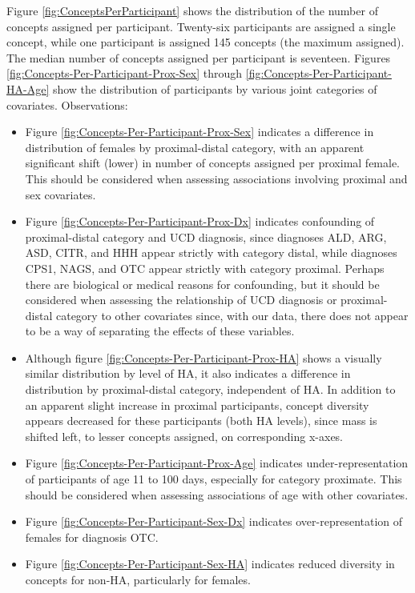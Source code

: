 \documentclass[10pt, letterpaper]{article}
\begin{document}
\begin{spacing}{1.0}
Figure \ref{fig:ConceptsPerParticipant} shows the distribution of the number of concepts assigned per participant.  Twenty-six participants are assigned a single concept, while one participant is assigned 145 concepts (the maximum assigned).  The median number of concepts assigned per participant is seventeen.  Figures \ref{fig:Concepts-Per-Participant-Prox-Sex} through \ref{fig:Concepts-Per-Participant-HA-Age} show the distribution of participants by various joint categories of covariates.  Observations:

\begin{itemize}
    \item Figure \ref{fig:Concepts-Per-Participant-Prox-Sex} indicates a difference in distribution of females by proximal-distal category, with an apparent significant shift (lower) in number of concepts assigned per proximal female.  This should be considered when assessing associations involving proximal and sex covariates.
    \item Figure \ref{fig:Concepts-Per-Participant-Prox-Dx} indicates confounding of proximal-distal category and UCD diagnosis, since diagnoses ALD, ARG, ASD, CITR, and HHH appear strictly with category distal, while diagnoses CPS1, NAGS, and OTC appear strictly with category proximal.  Perhaps there are biological or medical reasons for confounding, but it should be considered when assessing the relationship of UCD diagnosis or proximal-distal category to other covariates since, with our data, there does not appear to be a way of separating the effects of these variables.
    \item Although figure \ref{fig:Concepts-Per-Participant-Prox-HA} shows a visually similar distribution by level of HA, it also indicates a difference in distribution by proximal-distal category, independent of HA.  In addition to an apparent slight increase in proximal participants, concept diversity appears decreased for these participants (both HA levels), since mass is shifted left, to lesser concepts assigned, on corresponding x-axes.
    \item Figure \ref{fig:Concepts-Per-Participant-Prox-Age} indicates under-representation of participants of age 11 to 100 days, especially for category proximate.  This should be considered when assessing associations of age with other covariates.
    \item Figure \ref{fig:Concepts-Per-Participant-Sex-Dx} indicates over-representation of females for diagnosis OTC.
    \item Figure \ref{fig:Concepts-Per-Participant-Sex-HA} indicates reduced diversity in concepts for non-HA, particularly for females.

\end{itemize}
\end{spacing}
\end{document}
